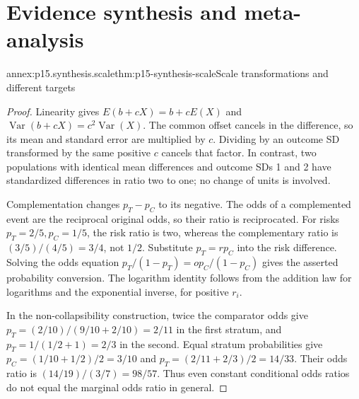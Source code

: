 \section{Evidence synthesis and meta-analysis}
\label{sec:p15-annex-evidence-synthesis}

\begin{annexitem}{annex:p15.synthesis.scale}{thm:p15-synthesis-scale}{Scale transformations and different targets}
\begin{proof}
Linearity gives \(E(b+cX)=b+cE(X)\) and
\(\operatorname{Var}(b+cX)=c^2\operatorname{Var}(X)\).
The common offset cancels in the difference, so its mean and standard
error are multiplied by \(c\). Dividing by an outcome SD transformed by
the same positive \(c\) cancels that factor. In contrast, two populations
with identical mean differences and outcome SDs 1 and 2 have standardized
differences in ratio two to one; no change of units is involved.

Complementation changes \(p_T-p_C\) to its negative. The odds of
a complemented event are the reciprocal original odds, so their ratio is
reciprocated. For risks \(p_T=2/5,p_C=1/5\), the risk ratio is two,
whereas the complementary ratio is \((3/5)/(4/5)=3/4\), not \(1/2\).
Substitute \(p_T=rp_C\) into the risk difference. Solving the odds
equation \(p_T/(1-p_T)=op_C/(1-p_C)\) gives the asserted probability
conversion. The logarithm identity follows from the addition law for
logarithms and the exponential inverse, for positive \(r_i\).

In the non-collapsibility construction, twice the comparator odds give
\(p_T=(2/10)/(9/10+2/10)=2/11\) in the first stratum, and
\(p_T=1/(1/2+1)=2/3\) in the second. Equal stratum probabilities give
\(p_C=(1/10+1/2)/2=3/10\) and
\(p_T=(2/11+2/3)/2=14/33\). Their odds ratio is
\((14/19)/(3/7)=98/57\). Thus even constant conditional odds ratios
do not equal the marginal odds ratio in general.
\end{proof}
\end{annexitem}

